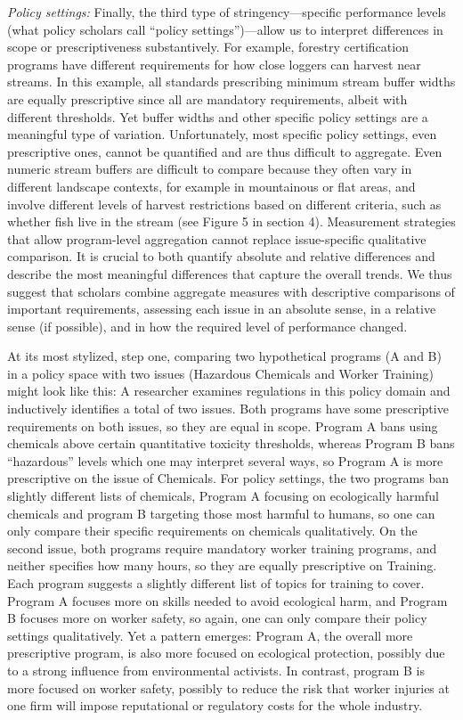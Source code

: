 \documentclass[
      12pt,
            Review ]{article}
\begin{document}


\emph{Policy settings:} Finally, the third type of stringency---specific
performance levels (what policy scholars call ``policy
settings'')---allow us to interpret differences in scope or
prescriptiveness substantively. For example, forestry certification
programs have different requirements for how close loggers can harvest
near streams. In this example, all standards prescribing minimum stream
buffer widths are equally prescriptive since all are mandatory
requirements, albeit with different thresholds. Yet buffer widths and
other specific policy settings are a meaningful type of variation.
Unfortunately, most specific policy settings, even prescriptive ones,
cannot be quantified and are thus difficult to aggregate. Even numeric
stream buffers are difficult to compare because they often vary in
different landscape contexts, for example in mountainous or flat areas,
and involve different levels of harvest restrictions based on different
criteria, such as whether fish live in the stream (see Figure 5 in
section 4). Measurement strategies that allow program-level aggregation
cannot replace issue-specific qualitative comparison. It is crucial to
both quantify absolute and relative differences and describe the most
meaningful differences that capture the overall trends. We thus suggest
that scholars combine aggregate measures with descriptive comparisons of
important requirements, assessing each issue in an absolute sense, in a
relative sense (if possible), and in how the required level of
performance changed.

At its most stylized, step one, comparing two hypothetical programs (A
and B) in a policy space with two issues (Hazardous Chemicals and Worker
Training) might look like this: A researcher examines regulations in
this policy domain and inductively identifies a total of two issues.
Both programs have some prescriptive requirements on both issues, so
they are equal in scope. Program A bans using chemicals above certain
quantitative toxicity thresholds, whereas Program B bans ``hazardous''
levels which one may interpret several ways, so Program A is more
prescriptive on the issue of Chemicals. For policy settings, the two
programs ban slightly different lists of chemicals, Program A focusing
on ecologically harmful chemicals and program B targeting those most
harmful to humans, so one can only compare their specific requirements
on chemicals qualitatively. On the second issue, both programs require
mandatory worker training programs, and neither specifies how many
hours, so they are equally prescriptive on Training. Each program
suggests a slightly different list of topics for training to cover.
Program A focuses more on skills needed to avoid ecological harm, and
Program B focuses more on worker safety, so again, one can only compare
their policy settings qualitatively. Yet a pattern emerges: Program A,
the overall more prescriptive program, is also more focused on
ecological protection, possibly due to a strong influence from
environmental activists. In contrast, program B is more focused on
worker safety, possibly to reduce the risk that worker injuries at one
firm will impose reputational or regulatory costs for the whole
industry.
\end{document}
